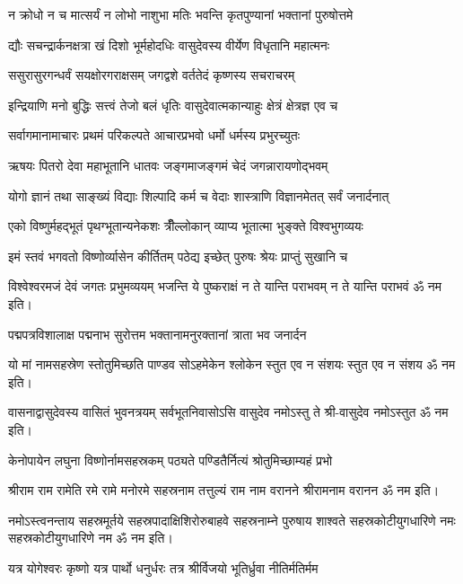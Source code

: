 \twolineshloka
{न क्रोधो न च मात्सर्यं न लोभो नाशुभा मतिः}
{भवन्ति कृतपुण्यानां भक्तानां पुरुषोत्तमे}

\twolineshloka
{द्यौः सचन्द्रार्कनक्षत्रा खं दिशो भूर्महोदधिः}
{वासुदेवस्य वीर्येण विधृतानि महात्मनः}

\twolineshloka
{ससुरासुरगन्धर्वं सयक्षोरगराक्षसम्}
{जगद्वशे वर्ततेदं कृष्णस्य सचराचरम्}

\twolineshloka
{इन्द्रियाणि मनो बुद्धिः सत्त्वं तेजो बलं धृतिः}
{वासुदेवात्मकान्याहुः क्षेत्रं क्षेत्रज्ञ एव च}

\twolineshloka
{सर्वागमानामाचारः प्रथमं परिकल्पते}
{आचारप्रभवो धर्मो धर्मस्य प्रभुरच्युतः}

\twolineshloka
{ऋषयः पितरो देवा महाभूतानि धातवः}
{जङ्गमाजङ्गमं चेदं जगन्नारायणोद्भवम्}

\twolineshloka
{योगो ज्ञानं तथा साङ्ख्यं विद्याः शिल्पादि कर्म च}
{वेदाः शास्त्राणि विज्ञानमेतत् सर्वं जनार्दनात्}

\twolineshloka
{एको विष्णुर्महद्भूतं पृथग्भूतान्यनेकशः}
{त्रीँल्लोकान् व्याप्य भूतात्मा भुङ्क्ते विश्वभुगव्ययः}

\twolineshloka
{इमं स्तवं भगवतो विष्णोर्व्यासेन कीर्तितम्}
{पठेद्य इच्छेत् पुरुषः श्रेयः प्राप्तुं सुखानि च}

\twolineshloka
{विश्वेश्वरमजं देवं जगतः प्रभुमव्ययम्}
{भजन्ति ये पुष्कराक्षं न ते यान्ति पराभवम्}
न ते यान्ति पराभवं ॐ नम इति।

\twolineshloka
{पद्मपत्रविशालाक्ष पद्मनाभ सुरोत्तम}
{भक्तानामनुरक्तानां त्राता भव जनार्दन}

\twolineshloka
{यो मां नामसहस्रेण स्तोतुमिच्छति पाण्डव}
{सोऽहमेकेन श्लोकेन स्तुत एव न संशयः}
स्तुत एव न संशय ॐ नम इति।

\twolineshloka
{वासनाद्वासुदेवस्य वासितं भुवनत्रयम्}
{सर्वभूतनिवासोऽसि वासुदेव नमोऽस्तु ते}
श्री-वासुदेव नमोऽस्तुत ॐ नम इति।

\twolineshloka
{केनोपायेन लघुना विष्णोर्नामसहस्रकम्}
{पठ्यते पण्डितैर्नित्यं श्रोतुमिच्छाम्यहं प्रभो}

\twolineshloka
{श्रीराम राम रामेति रमे रामे मनोरमे}
{सहस्रनाम तत्तुल्यं राम नाम वरानने}%
श्रीरामनाम वरानन ॐ नम इति।

\fourlineindentedshloka
{नमोऽस्त्वनन्ताय सहस्रमूर्तये}
{सहस्रपादाक्षिशिरोरुबाहवे}
{सहस्रनाम्ने पुरुषाय शाश्वते}
{सहस्रकोटीयुगधारिणे नमः}
सहस्रकोटीयुगधारिणे नम ॐ नम इति।

\twolineshloka
{यत्र योगेश्वरः कृष्णो यत्र पार्थो धनुर्धरः}
{तत्र श्रीर्विजयो भूतिर्ध्रुवा नीतिर्मतिर्मम}

